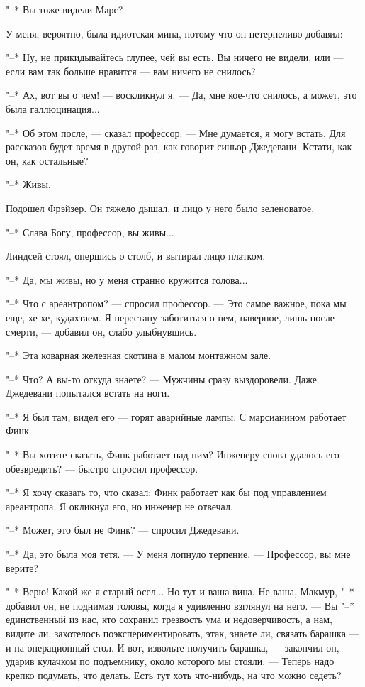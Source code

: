 "--* Вы тоже видели Марс?

У меня, вероятно,  была  идиотская  мина,  потому  что  он  нетерпеливо
добавил:

"--* Ну, не прикидывайтесь глупее, чей вы есть. Вы ничего не видели, или ---
если вам так больше нравится --- вам ничего не снилось?

"--* Ах, вот вы о чем! --- воскликнул я. --- Да, мне кое-что снилось, а может,
это была галлюцинация...

"--* Об этом после, --- сказал профессор. --- Мне думается, я могу встать. Для
рассказов будет время в другой раз, как говорит синьор Джедевани.  Кстати,
как он, как остальные?

"--* Живы.

Подошел Фрэйзер. Он тяжело дышал, и лицо у него было зеленоватое.

"--* Слава Богу, профессор, вы живы...

Линдсей стоял, опершись о столб, и вытирал лицо платком.

"--* Да, мы живы, но у меня странно кружится голова...

"--* Что с ареантропом? --- спросил профессор. --- Это самое важное,  пока  мы
еще, хе-хе, кудахтаем. Я перестану заботиться о нем, наверное, лишь  после
смерти, --- добавил он, слабо улыбнувшись.

"--* Эта коварная железная скотина в малом монтажном зале.

"--* Что? А  вы-то  откуда  знаете?  ---  Мужчины  сразу  выздоровели.  Даже
Джедевани попытался встать на ноги.

"--* Я был там, видел его --- горят аварийные лампы. С марсианином  работает
Финк.

"--* Вы хотите сказать, Финк работает над ним? Инженеру снова удалось  его
обезвредить? --- быстро спросил профессор.

"--* Я хочу сказать то, что сказал: Финк работает как бы  под  управлением
ареантропа. Я окликнул его, но инженер не отвечал.

"--* Может, это был не Финк? --- спросил Джедевани.

"--* Да, это была моя тетя. --- У меня лопнуло терпение. --- Профессор, вы мне
верите?

"--* Верю! Какой же я старый осел... Но тут и ваша вина. Не ваша,  Макмур,
"--* добавил он, не поднимая головы, когда я удивленно взглянул на него. --- Вы
"--* единственный из нас, кто сохранил трезвость ума и недоверчивость, а нам,
видите ли,  захотелось  поэкспериментировать,  этак,  знаете  ли,  связать
барашка --- и на операционный стол. И  вот,  извольте  получить  барашка,  ---
закончил он, ударив кулачком по подъемнику, около которого  мы  стояли.  ---
Теперь надо крепко подумать, что делать. Есть тут хоть что-нибудь, на  что
можно седеть?

